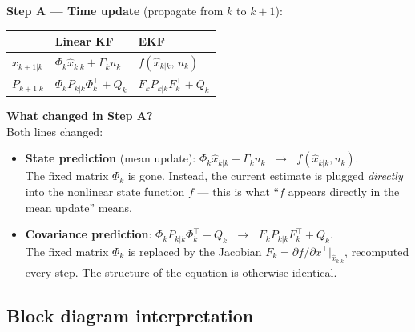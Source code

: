 \documentclass[12pt, a4paper]{article}
\begin{document}
\textbf{Step A --- Time update} (propagate from $k$ to $k+1$):

\medskip
\begin{center}
\renewcommand{\arraystretch}{1.6}
\begin{tabular}{p{0.9cm} p{5.2cm} p{5.2cm}}
  \toprule
  & \textbf{Linear KF} & \textbf{EKF} \\
  \midrule
  $\hat{x}_{k+1|k}$ &
    $\Phi_k \hat{x}_{k|k} + \Gamma_k u_k$ &
    $f(\hat{x}_{k|k},\, u_k)$ \\
  $P_{k+1|k}$ &
    $\Phi_k P_{k|k} \Phi_k^\top + Q_k$ &
    $F_k P_{k|k} F_k^\top + Q_k$ \\
  \bottomrule
\end{tabular}
\end{center}

\begin{notebox}
  \textbf{What changed in Step A?}\\
  Both lines changed:
  \begin{itemize}[leftmargin=1.4em, topsep=2pt]
    \item \textbf{State prediction} (mean update):
          $\Phi_k \hat{x}_{k|k} + \Gamma_k u_k$
          $\;\longrightarrow\;$
          $f(\hat{x}_{k|k}, u_k)$.\\
          The fixed matrix $\Phi_k$ is gone.
          Instead, the current estimate is plugged \emph{directly}
          into the nonlinear state function $f$ --- this is what
          ``$f$ appears directly in the mean update'' means.
    \item \textbf{Covariance prediction}:
          $\Phi_k P_{k|k} \Phi_k^\top + Q_k$
          $\;\longrightarrow\;$
          $F_k P_{k|k} F_k^\top + Q_k$.\\
          The fixed matrix $\Phi_k$ is replaced by the Jacobian
          $F_k = \partial f/\partial x^\top|_{\hat{x}_{k|k}}$,
          recomputed every step.
          The structure of the equation is otherwise identical.
  \end{itemize}
\end{notebox}

\subsection*{Block diagram interpretation}
\end{document}

